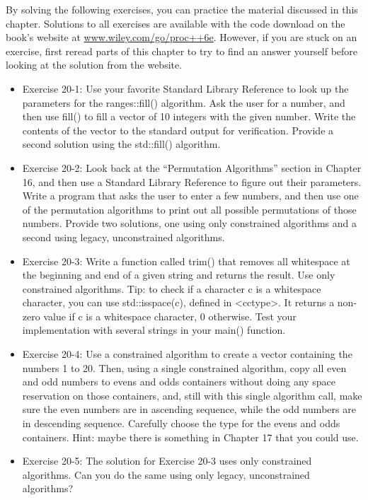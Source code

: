 By solving the following exercises, you can practice the material discussed in this chapter. Solutions to all exercises are available with the code download on the book’s website at \url{www.wiley.com/go/proc++6e}. However, if you are stuck on an exercise, first reread parts of this chapter to try to find an answer yourself before looking at the solution from the website.

\begin{itemize}
\item
Exercise 20-1: Use your favorite Standard Library Reference to look up the parameters for the ranges::fill() algorithm. Ask the user for a number, and then use fill() to fill a vector of 10 integers with the given number. Write the contents of the vector to the standard output for verification. Provide a second solution using the std::fill() algorithm.

\item
Exercise 20-2: Look back at the “Permutation Algorithms” section in Chapter 16, and then use a Standard Library Reference to figure out their parameters. Write a program that asks the user to enter a few numbers, and then use one of the permutation algorithms to print out all possible permutations of those numbers. Provide two solutions, one using only constrained algorithms and a second using legacy, unconstrained algorithms.

\item
Exercise 20-3: Write a function called trim() that removes all whitespace at the beginning and end of a given string and returns the result. Use only constrained algorithms. Tip: to check if a character c is a whitespace character, you can use std::isspace(c), defined in <cctype>. It returns a non-zero value if c is a whitespace character, 0 otherwise. Test your implementation with several strings in your main() function.

\item
Exercise 20-4: Use a constrained algorithm to create a vector containing the numbers 1 to 20. Then, using a single constrained algorithm, copy all even and odd numbers to evens and odds containers without doing any space reservation on those containers, and, still with this single algorithm call, make sure the even numbers are in ascending sequence, while the odd numbers are in descending sequence. Carefully choose the type for the evens and odds containers. Hint: maybe there is something in Chapter 17 that you could use.

\item
Exercise 20-5: The solution for Exercise 20-3 uses only constrained algorithms. Can you do the same using only legacy, unconstrained algorithms?
\end{itemize}












